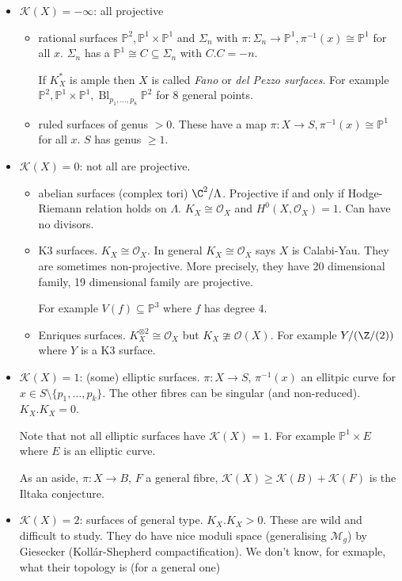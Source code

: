 \documentclass[a4paper]{article}
\renewcommand{\P}{\mathbb P} %
\DeclareMathOperator{\Bl}{Bl} %
\begin{document}
\begin{itemize}
\item \(\mathcal K(X) = -\infty\): all projective
  \begin{itemize}
  \item rational surfaces \(\P^2, \P^1 \times \P^1\) and \(\Sigma_n\) with \(\pi: \Sigma_n \to \P^1, \pi^{-1}(x) \cong \P^1\) for all \(x\). \(\Sigma_n\) has a \(\P^1 \cong C \subseteq \Sigma_n\) with \(C.C = -n\).
    \begin{remark}
      If \(K_X^*\) is ample then \(X\) is called \emph{Fano} or \emph{del Pezzo surfaces}. For example \(\P^2, \P^1 \times \P^1, \Bl_{p_1, \dots, p_8} \P^2\) for 8 general points.
    \end{remark}
  \item ruled surfaces of genus \(> 0\). These have a map \(\pi: X \to S, \pi^{-1}(x) \cong \P^1\) for all \(x\). \(S\) has genus \(\geq 1\).
  \end{itemize}
\item \(\mathcal K(X) = 0\): not all are projective.
  \begin{itemize}
  \item abelian surfaces (complex tori) \(\C^2/\Lambda\). Projective if and only if Hodge-Riemann relation holds on \(\Lambda\). \(K_X \cong \mathcal O_X\) and \(H^0(X, \mathcal O_X) = 1\). Can have no divisors.
  \item K3 surfaces. \(K_X \cong \mathcal O_X\). In general \(K_X \cong \mathcal O_X\) says \(X\) is Calabi-Yau. They are sometimes non-projective. More precisely, they have 20 dimensional family, 19 dimensional family are projective.

    For example \(V(f) \subseteq \P^3\) where \(f\) has degree \(4\).
  \item Enriques surfaces. \(K_X^{\otimes 2} \cong \mathcal O_X\) but \(K_X \ncong \mathcal O(X)\). For example \(Y/(\Z/(2))\) where \(Y\) is a K3 surface.
  \end{itemize}
\item \(\mathcal K(X) = 1\): (some) elliptic surfaces. \(\pi: X \to S\), \(\pi^{-1}(x)\) an ellitpic curve for \(x \in S \setminus \{p_1, \dots, p_k\}\). The other fibres can be singular (and non-reduced). \(K_X . K_X = 0\).

Note that not all elliptic surfaces have \(\mathcal K(X) = 1\). For example \(\P^1 \times E\) where \(E\) is an elliptic curve.

As an aside, \(\pi: X \to B\), \(F\) a general fibre, \(\mathcal K(X) \geq \mathcal K(B) + \mathcal K(F)\) is the Iltaka conjecture.
\item \(\mathcal K(X) = 2\): surfaces of general type. \(K_X . K_X > 0\). These are wild and difficult to study. They do have nice moduli space (generalising \(\mathcal M_g\)) by Giesecker (Kollár-Shepherd compactification). We don't know, for exmaple, what their topology is (for a general one)
\end{itemize}
\end{document}
